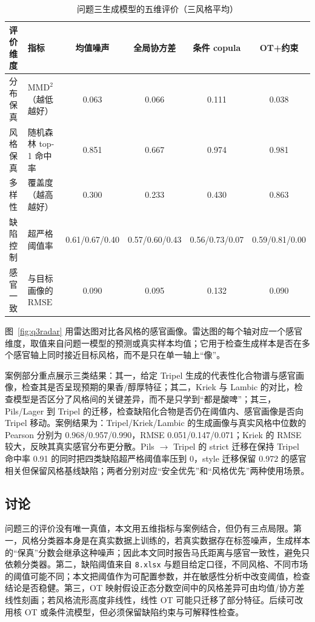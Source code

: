 \begin{table}[htbp]
  \centering
  \caption{问题三生成模型的五维评价（三风格平均）}
  \label{tab:q3-results}
  \footnotesize
  \setlength{\tabcolsep}{3pt}
  \begin{tabularx}{\textwidth}{@{}l X c c c c@{}}
    \toprule
    评价维度 & 指标 & 均值噪声 & 全局协方差 & 条件 copula & OT+约束 \\
    \midrule
    分布保真 & $\mathrm{MMD}^2$（越低越好） & 0.063 & 0.066 & 0.111 & 0.038 \\
    风格保真 & 随机森林 top-1 命中率 & 0.851 & 0.667 & 0.974 & 0.981 \\
    多样性 & 覆盖度（越高越好） & 0.300 & 0.233 & 0.430 & 0.863 \\
    缺陷控制 & 超严格阈值率 & 0.61/0.67/0.40 & 0.57/0.60/0.43 & 0.56/0.73/0.07 & 0.59/0.81/0.00 \\
    感官一致 & 与目标画像的 $\mathrm{RMSE}$ & 0.090 & 0.095 & 0.132 & 0.090 \\
    \bottomrule
  \end{tabularx}
\end{table}


图~\ref{fig:q3radar} 用雷达图对比各风格的感官画像。雷达图的每个轴对应一个感官维度，取值来自问题一模型的预测或真实样本均值；它用于检查生成样本是否在多个感官轴上同时接近目标风格，而不是只在单一轴上“像”。

案例部分重点展示三类结果：其一，给定 Tripel 生成的代表性化合物谱与感官画像，检查其是否呈现预期的果香/醇厚特征；其二，Kriek 与 Lambic 的对比，检查模型是否区分了风格间的关键差异，而不是只学到“都是酸啤”；其三，Pils/Lager 到 Tripel 的迁移，检查缺陷化合物是否仍在阈值内、感官画像是否向 Tripel 移动。案例结果为：Tripel/Kriek/Lambic 的生成画像与真实风格中位数的 Pearson 分别为 0.968/0.957/0.990，RMSE 0.051/0.147/0.071；Kriek 的 RMSE 较大，反映其真实感官分布更分散。Pils $\to$ Tripel 的 strict 迁移在保持 Tripel 命中率 0.91 的同时把四类缺陷超严格阈值率压到 0，style 迁移保留 0.972 的感官相关但保留风格基线缺陷；两者分别对应“安全优先”和“风格优先”两种使用场景。

\subsection{讨论}

问题三的评价没有唯一真值，本文用五维指标与案例结合，但仍有三点局限。第一，风格分类器本身是在真实数据上训练的，若真实数据存在标签噪声，生成样本的“保真”分数会继承这种噪声；因此本文同时报告马氏距离与感官一致性，避免只依赖分类器。第二，缺陷阈值来自 \texttt{8.xlsx} 与题目给定口径，不同风格、不同市场的阈值可能不同；本文把阈值作为可配置参数，并在敏感性分析中改变阈值，检查结论是否稳健。第三，OT 映射假设正态分数空间中的风格差异可由均值/协方差线性刻画；若风格流形高度非线性，线性 OT 可能只迁移了部分特征。后续可改用核 OT 或条件流模型，但必须保留缺陷约束与可解释性检查。

